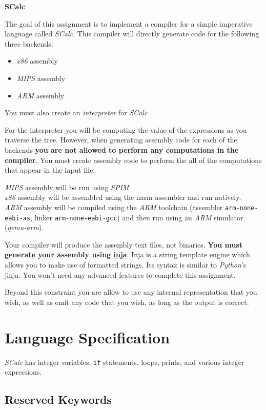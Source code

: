 \documentclass{article}
\newcommand{\code}[1]{\texttt{\textmd{#1}}}
\begin{document}
\ifpdf
	\LARGE
	\textbf{SCalc}
	\normalsize
\fi

The goal of this assignment is to implement a compiler for a simple imperative language called
\textit{SCalc}. This compiler will directly generate code for the following three backends:
\begin {itemize}
	\item \textit{x86} assembly
	\item \textit{MIPS} assembly
	\item \textit{ARM} assembly
\end {itemize}
You must also create an \textit{interpreter} for \textit{SCalc}

For the interpreter you will be computing the value of the expressions as you traverse the tree.
However, when generating assembly code for each of the backends \textbf{you are not allowed to
perform any computations in the compiler}. You must create assembly code to perform the all of the
computations that appear in the input file.

\textit{MIPS} assembly will be run using \textit{SPIM}\\
\textit{x86} assembly will be assembled using the nasm assembler and run natively.\\
\textit{ARM} assembly will be compiled using the \textit{ARM} toolchain (assembler
\code{arm-none-eabi-as}, linker \code{arm-none-eabi-gcc}) and then run using an \textit{ARM}
simulator (\textit{qemu-arm}).

Your compiler will produce the assembly text files, not binaries. \textbf{You must generate your
assembly using \href{https://github.com/pantor/inja}{inja}}. Inja is a string template engine which
allows you to make use of formatted strings. Its syntax is similar to \textit{Python}'s jinja. You
won't need any advanced features to complete this assignment.

Beyond this constraint you are allow to use any internal representation that you wish, as well as
emit any code that you wish, as long as the output is correct.

\section{Language Specification}
	\textit{SCalc} has integer variables, \code{if} statements, loops, prints, and various integer expressions.


	\subsection{Reserved Keywords}
\end{document}
